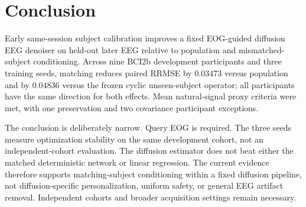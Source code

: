 \section{Conclusion}
\label{sec:conclusion}

Early same-session subject calibration improves a fixed EOG-guided diffusion
EEG denoiser on held-out later EEG relative to population and mismatched-subject
conditioning. Across nine BCI2b development participants and three training
seeds, matching reduces paired RRMSE by $0.03473$ versus population and by
$0.04836$ versus the frozen cyclic unseen-subject operator; all participants
have the same direction for both effects. Mean natural-signal proxy criteria
were met, with one preservation and two covariance participant exceptions.

The conclusion is deliberately narrow. Query EOG is required. The three seeds
measure optimization stability on the same development cohort, not an
independent-cohort evaluation. The diffusion estimator does not beat either the matched
deterministic network or linear regression. The current evidence therefore
supports matching-subject conditioning within a fixed diffusion pipeline, not
diffusion-specific personalization, uniform safety, or general EEG artifact
removal. Independent cohorts and broader acquisition settings remain necessary.
